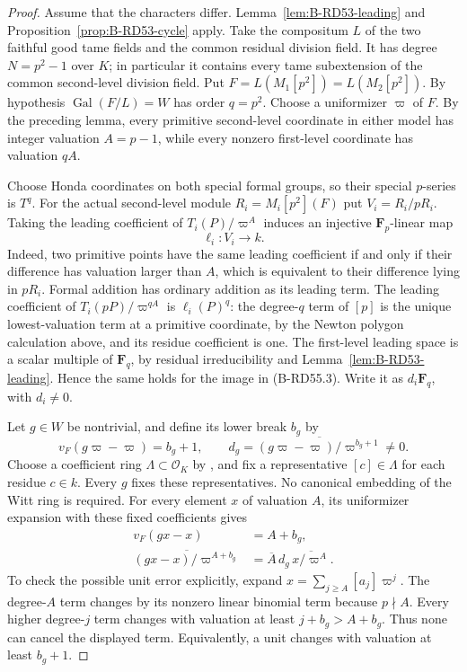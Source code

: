 \begin{proof}
Assume that the characters differ. Lemma~\ref{lem:B-RD53-leading}
and Proposition~\ref{prop:B-RD53-cycle} apply. Take the compositum
$L$ of the two faithful good tame fields and the common residual
division field. It has degree $N=p^2-1$ over $K$; in particular
it contains every tame subextension of the common second-level
division field. Put $F=L(M_1[p^2])=L(M_2[p^2])$.
By hypothesis $\operatorname{Gal}(F/L)=W$ has order $q=p^2$.
Choose a uniformizer $\varpi$ of $F$. By the preceding lemma,
every primitive second-level coordinate in either model has
integer valuation $A=p-1$, while every nonzero first-level
coordinate has valuation $qA$.

Choose Honda coordinates on both special formal groups, so
their special $p$-series is $T^q$. For the actual second-level
module $R_i=M_i[p^2](F)$ put $V_i=R_i/pR_i$. Taking the leading
coefficient of $T_i(P)/\varpi^A$ induces an injective
$\mathbf F_p$-linear map
\[
                         \ell_i:V_i\longrightarrow k.
                                                        \tag{B-RD55.3}
\]
Indeed, two primitive points have the same leading coefficient
if and only if their difference has valuation larger than $A$,
which is equivalent to their difference lying in $pR_i$.
Formal addition has ordinary addition as its leading term.
The leading coefficient of $T_i(pP)/\varpi^{qA}$ is
$\ell_i(P)^q$: the degree-$q$ term of $[p]$ is the unique
lowest-valuation term at a primitive coordinate, by the Newton
polygon calculation above, and its residue coefficient is one.
The first-level leading space is a scalar multiple of
$\mathbf F_q$, by residual irreducibility and
Lemma~\ref{lem:B-RD53-leading}. Hence the same holds for
the image in (B-RD55.3). Write it as $d_i\mathbf F_q$,
with $d_i\ne0$.

Let $g\in W$ be nontrivial, and define its lower break $b_g$ by
\[
 v_F(g\varpi-\varpi)=b_g+1,\qquad
 d_g=\overline{(g\varpi-\varpi)/\varpi^{b_g+1}}\ne0.
\]
Choose a coefficient ring $\Lambda\subset\mathcal O_K$ by
\citet[Theorem~10.160.8 and proof]{Stacks032A}, and fix a
representative $[c]\in\Lambda$ for each residue $c\in k$.
Every $g$ fixes these representatives. No canonical embedding
of the Witt ring is required. For every element $x$ of valuation
$A$, its uniformizer expansion with these fixed coefficients gives
\[
 \begin{split}
 v_F(gx-x)&=A+b_g,\\
 \overline{(gx-x)/\varpi^{A+b_g}}
       &=\overline A\,d_g\,\overline{x/\varpi^A}.
 \end{split}                                            \tag{B-RD55.4}
\]
To check the possible unit error explicitly, expand
$x=\sum_{j\ge A}[a_j]\varpi^j$. The degree-$A$ term changes
by its nonzero linear binomial term because $p\nmid A$.
Every higher degree-$j$ term changes with valuation at least
$j+b_g>A+b_g$. Thus none can cancel the displayed term.
Equivalently, a unit changes with valuation at least $b_g+1$.


\end{proof}
